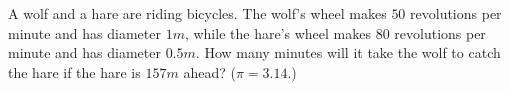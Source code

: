 A wolf and a hare are riding bicycles. The wolf's wheel makes $50$ revolutions per minute and has diameter $1m$, while the hare's wheel makes $80$ revolutions per minute and has diameter $0.5m$. How many minutes will it take the wolf to catch the hare if the hare is $157m$ ahead? ($\pi=3.14$.)
